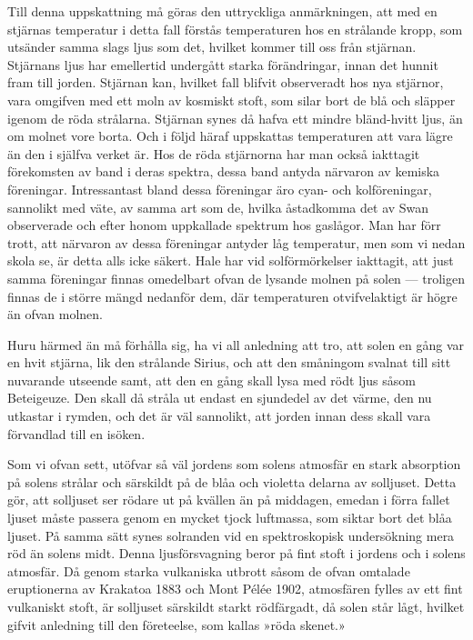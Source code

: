 \documentclass[a4paper, 12pt, oneside, swedish]{article}
\begin{document}
Till denna uppskattning må göras den uttryckliga anmärkningen, att med en stjärnas temperatur i detta fall förstås temperaturen hos en strålande kropp, som utsänder samma slags ljus som det, hvilket kommer till oss från stjärnan. Stjärnans ljus har emellertid undergått starka förändringar, innan det hunnit fram till jorden. Stjärnan kan, hvilket fall blifvit observeradt hos nya stjärnor, vara omgifven med ett moln av kosmiskt stoft, som silar bort de blå och släpper igenom de röda strålarna. Stjärnan synes då hafva ett mindre bländ-hvitt ljus, än om molnet vore borta. Och i följd häraf uppskattas temperaturen att vara lägre än den i själfva verket är. Hos de röda stjärnorna har man också iakttagit förekomsten av band i deras spektra, dessa band antyda närvaron av kemiska föreningar. Intressantast bland dessa föreningar äro cyan- och kolföreningar, sannolikt med väte, av samma art som de, hvilka åstadkomma det av Swan observerade och efter honom uppkallade spektrum hos gaslågor. Man har förr trott, att närvaron av dessa föreningar antyder låg temperatur, men som vi nedan skola se, är detta alls icke säkert. Hale har vid solförmörkelser iakttagit, att just samma föreningar finnas omedelbart ofvan de lysande molnen på solen --- troligen finnas de i större mängd nedanför dem, där temperaturen otvifvelaktigt är högre än ofvan molnen.

Huru härmed än må förhålla sig, ha vi all anledning att tro, att solen en gång var en hvit stjärna, lik den strålande Sirius, och att den småningom svalnat till sitt nuvarande utseende samt, att den en gång skall lysa med rödt ljus såsom Beteigeuze. Den skall då stråla ut endast en sjundedel av det värme, den nu utkastar i rymden, och det är väl sannolikt, att jorden innan dess skall vara förvandlad till en isöken.

Som vi ofvan sett, utöfvar så väl jordens som solens atmosfär en stark absorption på solens strålar och särskildt på de blåa och violetta delarna av solljuset. Detta gör, att solljuset ser rödare ut på kvällen än på middagen, emedan i förra fallet ljuset måste passera genom en mycket tjock luftmassa, som siktar bort det blåa ljuset. På samma sätt synes solranden vid en spektroskopisk undersökning mera röd än solens midt. Denna ljusförsvagning beror på fint stoft i jordens och i solens atmosfär. Då genom starka vulkaniska utbrott såsom de ofvan omtalade eruptionerna av Krakatoa 1883 och Mont Pélée 1902, atmosfären fylles av ett fint vulkaniskt stoft, är solljuset särskildt starkt rödfärgadt, då solen står lågt, hvilket gifvit anledning till den företeelse, som kallas »röda skenet.»
\end{document}
